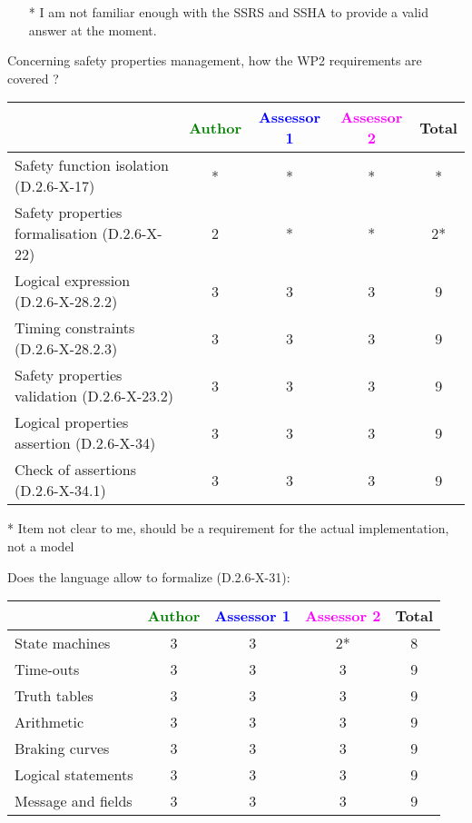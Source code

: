 \begin{assessor2}
  \begin{itemize}
  \item[*] I am not familiar enough with the SSRS and SSHA to provide a
    valid answer at the moment.
  \end{itemize}  
\end{assessor2}


Concerning safety properties management, how the WP2 requirements are covered ?

\begin{tabular}{|l | c | c | c | c|}
\hline
& \textcolor{green}{Author} & \textcolor{blue}{Assessor 1} & \textcolor{magenta}{Assessor 2} & Total \\
\hline
Safety function isolation (D.2.6-X-17) &* & * & * & * \\
\hline
Safety properties formalisation (D.2.6-X-22) &2 & * & * & 2* \\
\hline
Logical expression (D.2.6-X-28.2.2) &3 &3 &3 & 9  \\
\hline
Timing constraints (D.2.6-X-28.2.3) &3 &3 &3 & 9 \\
\hline
Safety properties validation (D.2.6-X-23.2) &3 &3 &3 & 9 \\
\hline
Logical properties assertion (D.2.6-X-34) &3 &3 &3 & 9 \\
\hline
Check of assertions (D.2.6-X-34.1) &3 &3 &3 & 9 \\
\hline
\end{tabular}

\begin{author_comment}
* Item not clear to me, should be a requirement for the actual implementation, not a model
\end{author_comment}

Does the language allow to formalize (D.2.6-X-31):

\begin{tabular}{|l | c | c | c | c|}
\hline
& \textcolor{green}{Author} & \textcolor{blue}{Assessor 1} & \textcolor{magenta}{Assessor 2} & Total \\
\hline
State machines &3 &3 & 2* & 8 \\
\hline
Time-outs &3 &3 &3 & 9 \\
\hline
Truth tables &3 &3 &3 & 9 \\
\hline
Arithmetic &3 &3 &3 & 9 \\
\hline
Braking curves &3 &3 &3 & 9 \\
\hline
Logical statements &3 &3 &3 & 9 \\
\hline
Message and fields &3 &3 &3 & 9 \\
\hline
\end{tabular}

